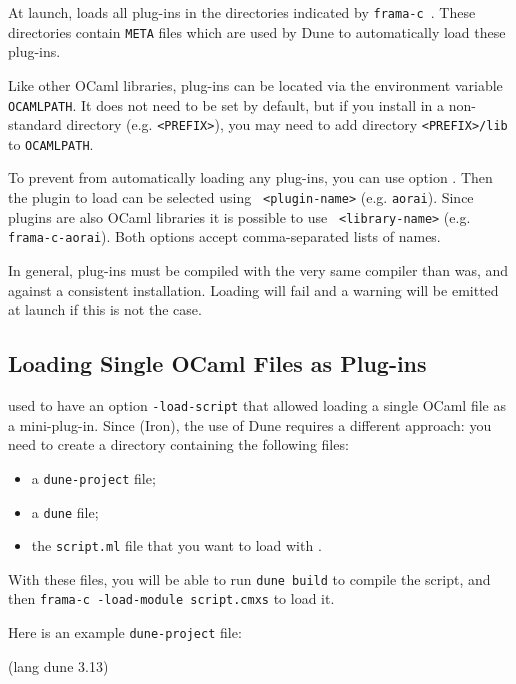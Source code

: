 At launch, \FramaC loads all plug-ins in the
directories indicated by \texttt{frama-c }.
These directories contain \texttt{META} files which are used by Dune to
automatically load these plug-ins.

Like other OCaml libraries, \FramaC plug-ins can be located via the environment
variable \texttt{OCAMLPATH}. It does not need to be set by
default, but if you install \FramaC in a non-standard directory
(e.g. \texttt{<PREFIX>}), you may need to add directory \texttt{<PREFIX>/lib}
to \texttt{OCAMLPATH}.

To prevent \FramaC from automatically loading any plug-ins, you can use option
. Then the plugin to load can be selected
using \texttt{ <plugin-name>} (e.g. \texttt{aorai}).
Since \FramaC plugins are also OCaml libraries it is possible to use
\texttt{ <library-name>}
(e.g. \texttt{frama-c-aorai}).
Both options accept comma-separated lists of names.

\begin{important}
In general, plug-ins must be compiled with the
very same \caml compiler than \FramaC was, and against a consistent \FramaC
installation. Loading will fail and a warning will be emitted at launch if this
is not the case.
\end{important}

\subsection{Loading Single OCaml Files as Plug-ins}

\FramaC used to have an option \texttt{-load-script} that allowed loading a
single OCaml file as a mini-plug-in. Since  (Iron), the use of Dune
requires a different approach: you need to create a directory containing the
following files:
\begin{itemize}
\item a \texttt{dune-project} file;
\item a \texttt{dune} file;
\item the \texttt{script.ml} file that you want to load with \FramaC.
\end{itemize}
With these files, you will be able to run \texttt{dune build} to compile the
script, and then \texttt{frama-c -load-module script.cmxs} to load it.

Here is an example \texttt{dune-project} file:
\begin{dunecode}
(lang dune 3.13)
\end{dunecode}

